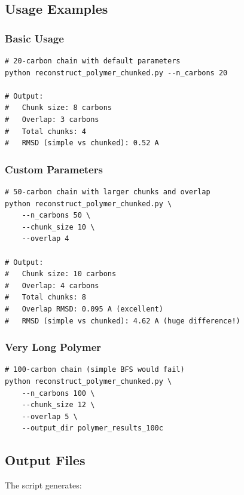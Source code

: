 \documentclass[11pt,a4paper]{article}
\begin{document}
\subsection{Usage Examples}

\subsubsection{Basic Usage}

\begin{verbatim}
# 20-carbon chain with default parameters
python reconstruct_polymer_chunked.py --n_carbons 20

# Output:
#   Chunk size: 8 carbons
#   Overlap: 3 carbons
#   Total chunks: 4
#   RMSD (simple vs chunked): 0.52 A
\end{verbatim}

\subsubsection{Custom Parameters}

\begin{verbatim}
# 50-carbon chain with larger chunks and overlap
python reconstruct_polymer_chunked.py \
    --n_carbons 50 \
    --chunk_size 10 \
    --overlap 4

# Output:
#   Chunk size: 10 carbons
#   Overlap: 4 carbons
#   Total chunks: 8
#   Overlap RMSD: 0.095 A (excellent)
#   RMSD (simple vs chunked): 4.62 A (huge difference!)
\end{verbatim}

\subsubsection{Very Long Polymer}

\begin{verbatim}
# 100-carbon chain (simple BFS would fail)
python reconstruct_polymer_chunked.py \
    --n_carbons 100 \
    --chunk_size 12 \
    --overlap 5 \
    --output_dir polymer_results_100c
\end{verbatim}

\subsection{Output Files}

The script generates:
\end{document}

